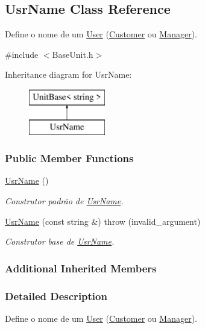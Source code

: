 \hypertarget{classUsrName}{\subsection{Usr\-Name Class Reference}
\label{da/df7/classUsrName}
}


Define o nome de um \hyperlink{classUser}{User} (\hyperlink{classCustomer}{Customer} ou \hyperlink{classManager}{Manager}).  




{\ttfamily \#include $<$Base\-Unit.\-h$>$}

Inheritance diagram for Usr\-Name\-:\begin{figure}[H]
\begin{center}
\leavevmode
\includegraphics[height=2.000000cm]{da/df7/classUsrName}
\end{center}
\end{figure}
\subsubsection*{Public Member Functions}
\begin{DoxyCompactItemize}
\item 
\hyperlink{classUsrName_a0b0d5b9167309872d29c60a1946375af}{Usr\-Name} ()
\begin{DoxyCompactList}\small\item\em Construtor padrão de \hyperlink{classUsrName}{Usr\-Name}. \end{DoxyCompactList}\item 
\hyperlink{classUsrName_a3028672b21248ef880a01e3621e02827}{Usr\-Name} (const string \&)  throw (invalid\-\_\-argument)
\begin{DoxyCompactList}\small\item\em Construtor base de \hyperlink{classUsrName}{Usr\-Name}. \end{DoxyCompactList}\end{DoxyCompactItemize}
\subsubsection*{Additional Inherited Members}


\subsubsection{Detailed Description}
Define o nome de um \hyperlink{classUser}{User} (\hyperlink{classCustomer}{Customer} ou \hyperlink{classManager}{Manager}). 


